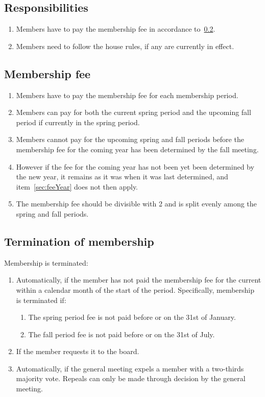 \subsection{Responsibilities}
\begin{enumerate}
  \item Members have to pay the membership fee in accordance to~\ref{sec:membershipFee}.
  \item Members need to follow the house rules, if any are currently in effect.
\end{enumerate}

\subsection{Membership fee} \label{sec:membershipFee}
\begin{enumerate}
  \item Members have to pay the membership fee for each membership period.
  \item Members can pay for both the current spring period and the upcoming fall period if currently in the spring period.
  \item Members cannot pay for the upcoming spring and fall periods before the membership fee for the coming year has been determined by the fall meeting. \label{sec:feeYear}
  \item However if the fee for the coming year has not been yet been determined by the new year, it remains as it was when it was last determined, and item~\ref{sec:feeYear} does not then apply.
  \item The membership fee should be divisible with 2 and is split evenly among the spring and fall periods.
\end{enumerate}

\subsection{Termination of membership} \label{sec:membershipTermination}
Membership is terminated:
\begin{enumerate}
  \item Automatically, if the member has not paid the membership fee for the current within a calendar month of the start of the period. Specifically, membership is terminated if:
  \begin{enumerate}
    \item The spring period fee is not paid before or on the 31st of January.
    \item The fall period fee is not paid before or on the 31st of July.
  \end{enumerate}
  \item If the member requests it to the board.
  \item Automatically, if the general meeting expels a member with a two-thirds majority vote. Repeals can only be made through decision by the general meeting.
\end{enumerate}


